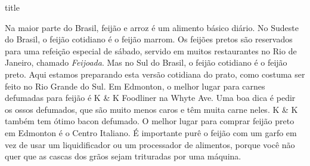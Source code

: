 \documentclass [11pt, letterpaper] {article}
\begin{document}
 {title}

Na maior parte do Brasil, feijão e arroz é um alimento básico diário.
No Sudeste do Brasil, o feijão cotidiano \'e o feijão marrom. Os feijões pretos são reservados para uma refeição especial de sábado, servido em muitos restaurantes no Rio de Janeiro, chamado {\it Feijoada}. Mas no Sul do Brasil, o feijão cotidiano é o feijão preto. Aqui estamos preparando esta versão cotidiana do prato, como costuma ser feito no Rio Grande do Sul. Em Edmonton, o melhor lugar para carnes defumadas para feijão é K \& K Foodliner na Whyte Ave. Uma boa dica é pedir os ossos defumados, que são muito menos caros e têm muita carne neles. K \& K também tem ótimo bacon defumado. O melhor lugar para comprar feijão preto em Edmonton é o Centro Italiano. É importante purê o feijão com um garfo em vez de usar um liquidificador ou um processador de alimentos, porque você não quer que as cascas dos grãos sejam trituradas por uma máquina.

\vspace {0.3in}
\end{document}
